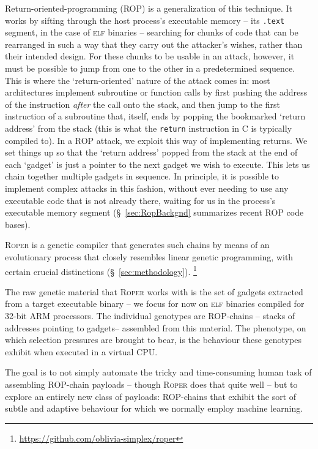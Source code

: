Return-oriented-programming (ROP) is a generalization of this
technique. It works by sifting through the host process's executable
memory -- its \texttt{.text} segment, in the case of \textsc{elf}
binaries -- searching for chunks of code that can be rearranged in
such a way that they carry out the attacker's wishes, rather than
their intended design. For these chunks to be usable in an attack,
however, it must be possible to jump from one to the other in a
predetermined sequence. This is where the `return-oriented' nature of
the attack comes in: most architectures implement subroutine or
function calls by first pushing the address of the instruction
\emph{after} the call onto the stack, and then jump to the first
instruction of a subroutine that, itself, ends by popping the
bookmarked `return address' from the stack (this is what the \texttt{return} instruction in C is typically compiled to). In a ROP attack, we
exploit this way of implementing returns. We set things up so that
the `return address' popped from the stack at the end of each `gadget'
is just a pointer to the next gadget we wish to execute. This lets us
chain together multiple gadgets in sequence. In principle, it is
possible to implement complex attacks in this fashion, without ever
needing to use any executable code that is not already there, waiting
for us in the process's executable memory segment
(\S~\ref{sec:RopBackgnd} summarizes recent ROP code bases).


\textsc{Roper} is a genetic compiler that generates such chains by
means of an evolutionary process that closely resembles linear
genetic programming, with certain crucial distinctions (\S~\ref{sec:methodology}).%
\footnote{\url{https://github.com/oblivia-simplex/roper}}

The raw genetic material that \textsc{Roper} works with is
the set of gadgets extracted from a target executable binary --
we focus for now on \textsc{elf} binaries compiled for 32-bit
ARM processors. The individual genotypes are
ROP-chains -- stacks of addresses pointing to gadgets-- assembled from this material. The phenotype, on
which selection pressures are brought to bear, is the behaviour
these genotypes exhibit when executed in a virtual CPU.

The goal is to not simply automate the tricky and time-consuming human
task of assembling ROP-chain payloads -- though \textsc{Roper} does
that quite well -- but to explore an entirely new class of payloads:
ROP-chains that exhibit the sort of subtle and adaptive behaviour for
which we normally employ machine learning.

